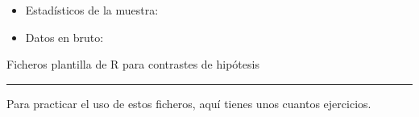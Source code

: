\documentclass[10pt,a4paper]{article}\usepackage[]{graphicx}\usepackage[]{color}
\newcounter {cont01}
\begin{document}
\begin{table}[b!]
{\begin{minipage}{14cm}
\begin{itemize}
\begin{itemize}
\begin{itemize}
                  \item Estadísticos de la muestra:

                  \item Datos en bruto:

                \end{itemize}\end{itemize}

    \end{itemize}
\end{minipage}
}
  \caption{Ficheros plantilla de R para contrastes de hipótesis}
  \label{tut07:tabla:FicherosPlantillaRContrastes}
\hrule
\end{table}

Para practicar el uso de estos ficheros, aquí tienes unos cuantos ejercicios.
\end{document}
